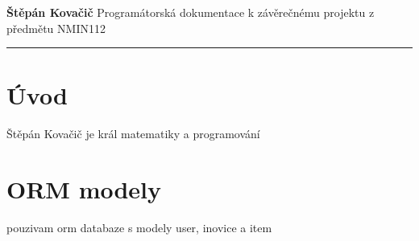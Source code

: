 \documentclass[a4paper,12pt]{article}
\begin{document}
\noindent
{\large \textbf{Štěpán Kovačič}} \hfill {Programátorská dokumentace k závěrečnému projektu z předmětu NMIN112}\\[-0.2em]

\vspace{0.4em}
\hrule
\vspace{0.6em}

\section*{Úvod}
Štěpán Kovačič je král matematiky a programování
\section{ORM modely }
pouzivam orm databaze s modely user, inovice a item
\end{document}

